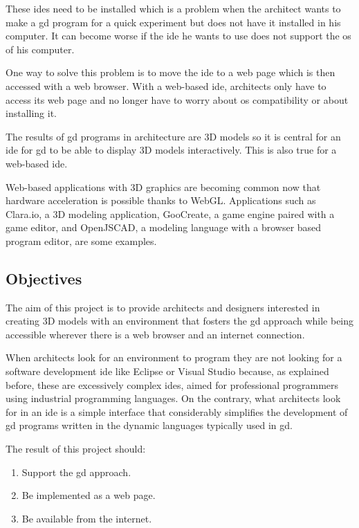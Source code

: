 \documentclass{./llncs2e/llncs}
\begin{document}
	These \acp{ide} need to be installed which is a problem when the architect wants to make a \ac{gd} program for a quick experiment but does not have it installed in his computer.
	It can become worse if the \ac{ide} he wants to use does not support the \ac{os} of his computer.

	One way to solve this problem is to move the \ac{ide} to a web page which is then accessed with a web browser.
	With a web-based \ac{ide}, architects only have to access its web page and no longer have to worry about \ac{os} compatibility or about installing it.

	The results of \ac{gd} programs in architecture are 3D models so it is central for an \ac{ide} for \ac{gd} to be able to display 3D models interactively.
	This is also true for a web-based \ac{ide}.
	
	Web-based applications with 3D graphics are becoming common now that hardware acceleration is possible thanks to WebGL\cite{marrin2011webgl}.
	Applications such as Clara.io\cite{houston2013clara}, a 3D modeling application, GooCreate\cite{goocreate2015site}, a game engine paired with a game editor, and OpenJSCAD\cite{openjscad2015site}, a modeling language with a browser based program editor, are some examples.
	
	
\subsection{Objectives}
	The aim of this project is to provide architects and designers interested in creating 3D models with an environment that fosters the \acl{gd} approach while being accessible wherever there is a web browser and an internet connection.

	When architects look for an environment to program they are not looking for a software development \ac{ide} like Eclipse or Visual Studio because, as explained before, these are excessively complex \acp{ide}, aimed for professional programmers using industrial programming languages.
	On the contrary, what architects look for in an \ac{ide} is a simple interface that considerably simplifies the development of \ac{gd} programs written in the dynamic languages typically used in \ac{gd}. 

	The result of this project should:
	\begin{enumerate}
		\item Support the \acl{gd} approach.
		\item Be implemented as a web page.
		\item Be available from the internet.
	\end{enumerate}
	
\end{document}
